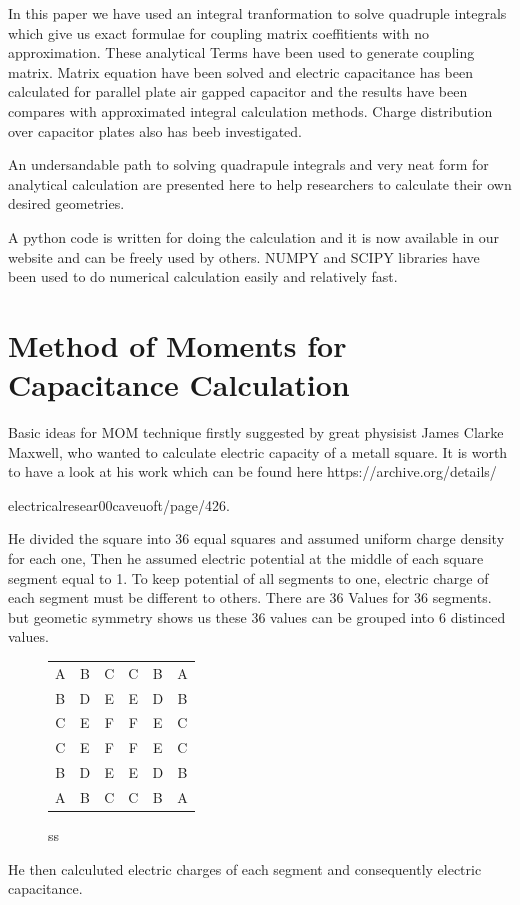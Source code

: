 \documentclass[twoside,twocolumn]{article}
\begin{document}
In this paper we have used an integral tranformation %
to solve quadruple integrals which give us exact formulae for coupling matrix coeffitients with no approximation. These analytical Terms %
have been used to generate coupling matrix. Matrix equation have been solved and electric capacitance has been calculated for parallel plate air gapped capacitor and the results have been compares with approximated integral calculation methods. Charge distribution over capacitor plates also has beeb investigated.

An undersandable path to solving quadrapule integrals and very neat form for analytical calculation are presented here to help researchers to calculate their own desired geometries.

A python code is written for doing the calculation and it is now available in our website and can be freely used by others. NUMPY and SCIPY libraries have been used to do numerical calculation easily and relatively %
 fast.
\section{Method of Moments for Capacitance Calculation}

Basic ideas for MOM technique firstly suggested by great physisist James Clarke Maxwell, who wanted to calculate electric capacity of a metall square. It is worth to have a look at his work which can be found here https://archive.org/details/

electricalresear00caveuoft/page/426.


He divided the square into 36 equal squares and assumed uniform charge density for each one, Then he assumed electric potential at the middle of each square segment equal to 1. To keep potential of all segments to one, electric charge of each segment must be different to others. There are 36 Values for 36 segments. but geometic symmetry shows us these 36 values can be grouped into 6 distinced values. 
\begin {figure}
\center
\begin{tabular}{ c c c c c c }
  A & B & C & C & B & A \\
  B & D & E & E & D & B \\
  C & E & F & F & E & C \\
  C & E & F & F & E & C \\
  B & D & E & E & D & B \\
  A & B & C & C & B & A \\
\end{tabular}
\caption{ss}
\end{figure}
He then calculuted electric charges of each segment and consequently electric capacitance.
\end{document}
